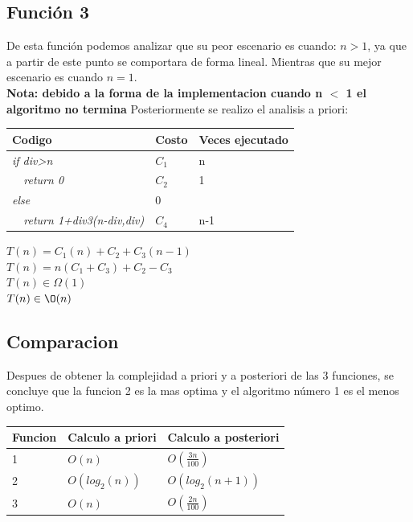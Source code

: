 \documentclass[spanish]{article}
\begin{document}
					\subsection*{Función 3}
					De esta función podemos analizar que su peor escenario es cuando: $n>1$, ya que a partir de este punto se comportara de forma lineal. Mientras que su mejor escenario es cuando $n=1$.\\
					\textbf{Nota: debido a la forma de la implementacion cuando n $<$ 1 el algoritmo no termina}
					Posteriormente se realizo el analisis a priori:\\
					\begin{center}
						\begin{table}[H]
							\begin{tabular}{|l|l|l|}
								\hline
								\rowcolor[HTML]{FFCC67} 
								Codigo                               & Costo & Veces ejecutado \\ \hline
								\textit{if div>n}                   & $C_1$   & n               \\ \hline
								\textit{\  \  return 0}              & $C_2$   & 1               \\ \hline
								\textit{else}                        & 0     &                 \\ \hline
								\textit{\  \  return 1+div3(n-div,div)} & $C_4$   & n-1             \\ \hline
							\end{tabular}
						\end{table}
						$T(n) = C_1(n) + C_2 + C_3(n-1)$\\
						$T(n) = n(C_1+C_3) + C_2 - C_3$\\
						$T(n) \in \Omega(1)$\\
						$T(n) \in \O(n)$
					\end{center}
					\subsection*{Comparacion}
					Despues de obtener la complejidad a priori y a posteriori de las 3 funciones, se concluye que la funcion 2 es la mas optima y el algoritmo número 1 es el menos optimo.
					\begin{table}[H]
						\begin{tabular}{|l|l|l|}
							\hline
							\rowcolor[HTML]{FFCC67} 
							Funcion & Calculo a priori & Calculo a posteriori \\ \hline
							\rowcolor[HTML]{FE0000} 
							1       & $O(n)$           & $O(\frac{3n}{100})$              \\ \hline
							\rowcolor[HTML]{32CB00} 
							2       & $O(log_2(n))$    & $O(log_2(n+1))$     \\ \hline
							\rowcolor[HTML]{F8FF00} 
							3       & $O(n)$           & $O(\frac{2n}{100})$              \\ \hline
						\end{tabular}
					\end{table}
\end{document}
